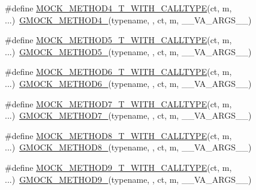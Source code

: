 \begin{DoxyCompactItemize}
\item 
\#define \hyperlink{gmock-generated-function-mockers_8h_aae18ec395b1ba3e991a25ffb997821ee}{M\+O\+C\+K\+\_\+\+M\+E\+T\+H\+O\+D4\+\_\+\+T\+\_\+\+W\+I\+T\+H\+\_\+\+C\+A\+L\+L\+T\+Y\+PE}(ct,  m, ...)~\hyperlink{gmock-generated-function-mockers_8h_ab6430f2cfad9de4aca5258ea559294bb}{G\+M\+O\+C\+K\+\_\+\+M\+E\+T\+H\+O\+D4\+\_\+}(typename, , ct, m, \+\_\+\+\_\+\+V\+A\+\_\+\+A\+R\+G\+S\+\_\+\+\_\+)
\item 
\#define \hyperlink{gmock-generated-function-mockers_8h_a04f83b372ebe63dea92cb5c3502ff345}{M\+O\+C\+K\+\_\+\+M\+E\+T\+H\+O\+D5\+\_\+\+T\+\_\+\+W\+I\+T\+H\+\_\+\+C\+A\+L\+L\+T\+Y\+PE}(ct,  m, ...)~\hyperlink{gmock-generated-function-mockers_8h_a9e3ecd392499ab19a4a6d3adcabf56f6}{G\+M\+O\+C\+K\+\_\+\+M\+E\+T\+H\+O\+D5\+\_\+}(typename, , ct, m, \+\_\+\+\_\+\+V\+A\+\_\+\+A\+R\+G\+S\+\_\+\+\_\+)
\item 
\#define \hyperlink{gmock-generated-function-mockers_8h_a0dfe65f974c2b6d60cac3114489b4527}{M\+O\+C\+K\+\_\+\+M\+E\+T\+H\+O\+D6\+\_\+\+T\+\_\+\+W\+I\+T\+H\+\_\+\+C\+A\+L\+L\+T\+Y\+PE}(ct,  m, ...)~\hyperlink{gmock-generated-function-mockers_8h_ad0ca7f6973a076d0af4c953f8ed91842}{G\+M\+O\+C\+K\+\_\+\+M\+E\+T\+H\+O\+D6\+\_\+}(typename, , ct, m, \+\_\+\+\_\+\+V\+A\+\_\+\+A\+R\+G\+S\+\_\+\+\_\+)
\item 
\#define \hyperlink{gmock-generated-function-mockers_8h_ae820565d836fda34401e8bdcfaaa7605}{M\+O\+C\+K\+\_\+\+M\+E\+T\+H\+O\+D7\+\_\+\+T\+\_\+\+W\+I\+T\+H\+\_\+\+C\+A\+L\+L\+T\+Y\+PE}(ct,  m, ...)~\hyperlink{gmock-generated-function-mockers_8h_ab98a8399ba62b53b375c2807f4d39d2f}{G\+M\+O\+C\+K\+\_\+\+M\+E\+T\+H\+O\+D7\+\_\+}(typename, , ct, m, \+\_\+\+\_\+\+V\+A\+\_\+\+A\+R\+G\+S\+\_\+\+\_\+)
\item 
\#define \hyperlink{gmock-generated-function-mockers_8h_a0cf1d3aba371dfe424d27b97b5473174}{M\+O\+C\+K\+\_\+\+M\+E\+T\+H\+O\+D8\+\_\+\+T\+\_\+\+W\+I\+T\+H\+\_\+\+C\+A\+L\+L\+T\+Y\+PE}(ct,  m, ...)~\hyperlink{gmock-generated-function-mockers_8h_aa84a36427c44505207b7cad5dec7ad67}{G\+M\+O\+C\+K\+\_\+\+M\+E\+T\+H\+O\+D8\+\_\+}(typename, , ct, m, \+\_\+\+\_\+\+V\+A\+\_\+\+A\+R\+G\+S\+\_\+\+\_\+)
\item 
\#define \hyperlink{gmock-generated-function-mockers_8h_ad1bd879e10bad098cf68c27c75f4be09}{M\+O\+C\+K\+\_\+\+M\+E\+T\+H\+O\+D9\+\_\+\+T\+\_\+\+W\+I\+T\+H\+\_\+\+C\+A\+L\+L\+T\+Y\+PE}(ct,  m, ...)~\hyperlink{gmock-generated-function-mockers_8h_aa820171a19cc587c247dbe05cbffc55f}{G\+M\+O\+C\+K\+\_\+\+M\+E\+T\+H\+O\+D9\+\_\+}(typename, , ct, m, \+\_\+\+\_\+\+V\+A\+\_\+\+A\+R\+G\+S\+\_\+\+\_\+)

\end{DoxyCompactItemize}
